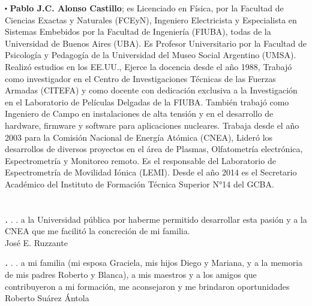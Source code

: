 \documentclass[
11pt, %
spanish,
singlespacing, %
parskip, %
headsepline, %
]{MastersDoctoralThesis} %
\begin{document}
\begin{sloppypar}
$\centerdot$ \textbf{Pablo J.C. Alonso Castillo}; es Licenciado en Física, por la Facultad de Ciencias Exactas y Naturales (FCEyN), Ingeniero Electricista y Especialista en Sistemas Embebidos por la Facultad de Ingeniería (FIUBA), todas de la Universidad de Buenos Aires (UBA). Es Profesor Universitario  por la Facultad de Psicología y Pedagogía de la Universidad del Museo Social Argentino (UMSA). Realizó estudios en los EE.UU., Ejerce la docencia desde el año 1988, Trabajó como investigador en el Centro de Investigaciones Técnicas de las Fuerzas Armadas (CITEFA) y como docente con dedicación exclusiva a la Investigación en el Laboratorio de Películas Delgadas de la FIUBA. También  trabajó como Ingeniero de Campo en instalaciones de alta tensión y en el desarrollo de hardware, firmware y software para aplicaciones nucleares. Trabaja desde el año 2003 para la Comisión Nacional de Energía Atómica (CNEA), Lideró los desarrollos de diversos proyectos en el área de Plasmas, Olfatometría electrónica, Espectrometría y Monitoreo remoto. Es el responsable del Laboratorio de Espectrometría de Movilidad Iónica (LEMI). Desde el año 2014 es el Secretario Académico del Instituto de Formación Técnica Superior N°14 del GCBA.

\end{sloppypar}



\chapter*{ }%

\vspace{0.5cm} 
\begin{flushright}
{\Large \textbf \textit . . . a la Universidad pública por haberme permitido desarrollar esta pasión y a la CNEA que me facilitó la concreción de mi familia.  \\
\vspace{5mm}
José E. Ruzzante}
\end{flushright}
\vspace{1.0cm} 

\begin{flushright}
{\Large \textbf \textit . . . a mi familia (mi esposa Graciela, mis hijos Diego y Mariana, y a la memoria de mis padres Roberto y Blanca), a mis maestros y a los amigos que contribuyeron a mi formación, me aconsejaron y me brindaron oportunidades \\
\vspace{5mm}
Roberto Suárez Ántola}
\end{flushright}
\vspace{1.0cm} 
\end{document}
